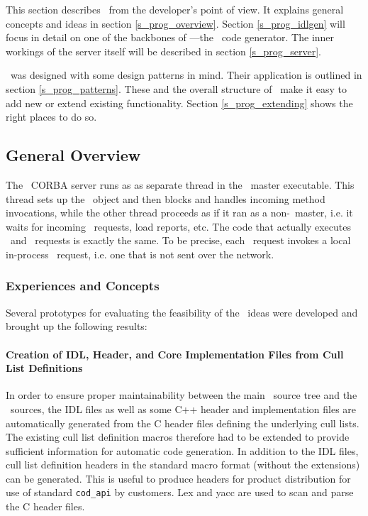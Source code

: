 This section describes \qidl\ from the developer's point of view. It explains
general concepts and ideas in section \ref{s_prog_overview}. Section
\ref{s_prog_idlgen} will focus in detail on one of the backbones of
\qidl---the \idlgen\ code generator. The inner workings of the server itself
will be described in section \ref{s_prog_server}.

\qidl\ was designed with some design patterns in mind. Their application is
outlined in section \ref{s_prog_patterns}. These and the overall structure of
\qidl\ make it easy to add new or extend existing functionality. Section
\ref{s_prog_extending} shows the right places to do so.

\subsection{\label{s_prog_overview}General Overview}
The \qidl\ CORBA server runs as as separate thread in the \codine\ master 
executable.
This thread sets up the \master\ object and then blocks and handles
incoming method invocations, while the other thread proceeds as if it ran as
a non-\qidl\ master, i.e. it waits for incoming \codapi\ requests, load reports,
etc. The code that actually executes \codapi\ and \qidl\ requests is exactly the
same. To be precise, each \qidl\ request invokes a local in-process 
\codapi\ request, i.e. one that is not sent over the network.

\subsubsection{Experiences and Concepts}
Several prototypes for evaluating the feasibility of the \qidl\ ideas were
developed and brought up the following results:

\paragraph{Creation of IDL, Header, and Core Implementation Files from Cull
           List Definitions}
  In order to ensure proper maintainability between the main \codine\
  source tree and the \qidl\ sources, the IDL files as well as some C++
  header and implementation files are automatically
  generated from the C header files defining the underlying cull lists. The
  existing cull list definition macros therefore had to be extended to
  provide sufficient information for automatic code generation.
  In addition to the IDL files, cull list definition headers in the standard
  macro format (without the extensions) can be generated. This is useful to
  produce headers for product distribution for use of standard {\tt cod\_api}
  by customers. Lex and yacc are used to scan and parse the C header files.

